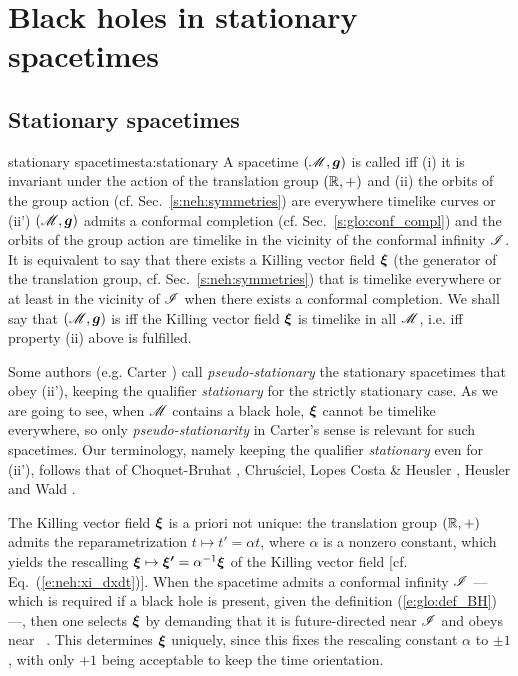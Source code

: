 \section{Black holes in stationary spacetimes} \label{s:sta:sta_st}

\subsection{Stationary spacetimes} \label{s:sta:def_station}

\begin{tdef}{stationary spacetime}{sta:stationary}
A spacetime $(\mathscr{M},\bm{g})$ is called 
iff (i) it is invariant under
the action of the translation group $(\mathbb{R},+)$ and (ii) the orbits of
the group action (cf. Sec.~\ref{s:neh:symmetries})
are everywhere timelike curves or (ii') $(\mathscr{M},\bm{g})$
admits a conformal completion (cf. Sec.~\ref{s:glo:conf_compl})
and the orbits of the group action are timelike in the vicinity of
the conformal infinity $\mathscr{I}$.
It is equivalent to say that there exists a Killing vector field
$\bm{\xi}$ (the generator of the translation group, cf. Sec.~\ref{s:neh:symmetries}) that is
timelike everywhere or at least in the vicinity of $\mathscr{I}$ when there exists a conformal
completion. We shall say that $(\mathscr{M},\bm{g})$ is  iff the Killing vector field $\bm{\xi}$ is timelike in all $\mathscr{M}$,
i.e. iff property (ii) above is fulfilled.
\end{tdef}

\begin{remark} \label{r:sta:pseudo-stationary}
Some authors (e.g. Carter \cite{Carte73b}) call
\emph{pseudo-stationary} the stationary spacetimes
that obey (ii'), keeping the qualifier
\emph{stationary} for the strictly stationary case.
As we are going to see, when $\mathscr{M}$
contains a black hole, $\bm{\xi}$ cannot be timelike everywhere,
so only \emph{pseudo-stationarity} in Carter's sense is relevant for such spacetimes.
Our terminology, namely keeping the qualifier \emph{stationary} even for (ii'),  follows that of
Choquet-Bruhat \cite{Choqu09},
Chru\'sciel, Lopes Costa \& Heusler \cite{ChrusLH12},
Heusler \cite{Heusl96}
and Wald \cite{Wald01}.
\end{remark}

The Killing vector field $\bm{\xi}$ is a priori not unique: the translation group $(\mathbb{R},+)$
admits the reparametrization
$t\mapsto t' = \alpha t$, where $\alpha$ is a nonzero constant, which yields
the rescalling $\bm{\xi} \mapsto \bm{\xi'} = \alpha^{-1} \bm{\xi}$
of the Killing vector field [cf. Eq.~(\ref{e:neh:xi_dxdt})]. When the
spacetime admits a conformal infinity $\mathscr{I}$ --- which is required if a black hole
is present, given the definition (\ref{e:glo:def_BH}) ---, then
one selects $\bm{\xi}$ by demanding that it is future-directed near $\mathscr{I}$ and
obeys
\be \label{e:sta:xi_scri}
    \w{\xi}\cdot\w{\xi}  \quad \mbox{near\ } \scri .
\ee
This determines $\bm{\xi}$ uniquely, since this fixes
the rescaling constant $\alpha$ to $\pm 1$, with only $+1$ being acceptable
to keep the time orientation.


